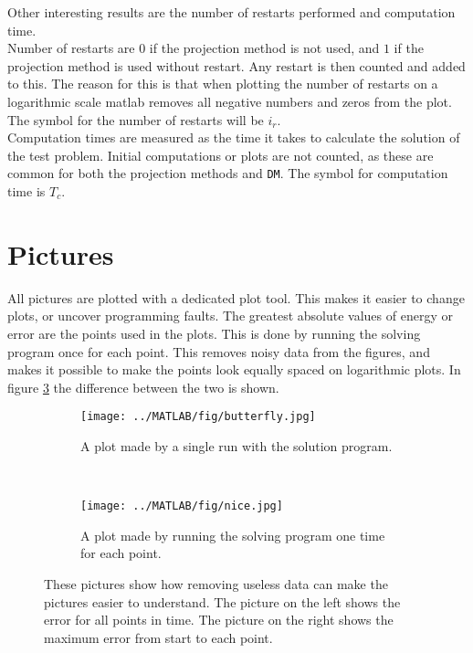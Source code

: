 \noindent Other interesting results are the number of restarts performed and computation time. \\
Number of restarts are $0$ if the projection method is not used, and $1$ if the projection method is used without restart. Any restart is then counted and added to this. The reason for this is that when plotting the number of restarts on a logarithmic scale matlab removes all negative numbers and zeros from the plot. The symbol for the number of restarts will be $i_r$.\\
Computation times are measured as the time  it takes to calculate the solution of the test problem. Initial computations or plots are not counted, as these are common for both the projection methods and \texttt{DM}.
The symbol for computation time is $T_c$.  \\

\section{Pictures}%
All pictures are plotted with a dedicated plot tool. This makes it easier to change plots, or uncover programming faults. The greatest absolute values of energy or error are the points used in the plots. This is done by running the solving program once for each point. This removes noisy data from the figures, and makes it possible to make the points look equally spaced on logarithmic plots. In figure \ref{fig:pic} the difference between the two is shown. \\
\begin{figure}[H]
        \centering
        \begin{subfigure}[b]{0.3\textwidth}
                \texttt{[image: ../MATLAB/fig/butterfly.jpg]}
                \caption{ A plot made by a single run with the solution program.  \\}
                \label{fig:butterfly}
        \end{subfigure}
        ~
        \begin{subfigure}[b]{0.3\textwidth}
                \texttt{[image: ../MATLAB/fig/nice.jpg]}
                \caption{ A plot made by running the solving program one time for each point. }
                \label{fig:nice}
        \end{subfigure}
        \caption{ These pictures show how removing useless data can make the pictures easier to understand. The picture on the left shows the error for all points in time. The picture on the right shows the maximum error from start to each point. }
        \label{fig:pic}
\end{figure}

